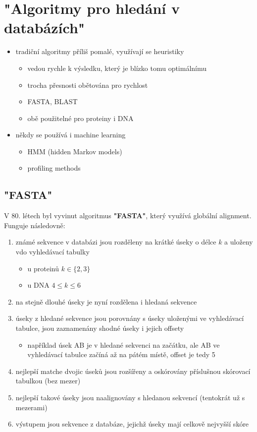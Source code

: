 \documentclass[DIV=8]{scrreprt}
\begin{document}
\section{"Algoritmy pro hledání v databázích"}

\begin{itemize}
    \item tradiční algoritmy příliš pomalé, využívají se heuristiky
\begin{itemize}
    \item vedou rychle k výsledku, který je blízko tomu optimálnímu
    \item trocha přesnosti obětována pro rychlost
    \item FASTA, BLAST
    \item obě použitelné pro proteiny i DNA
\end{itemize}

    \item někdy se používá i machine learning
\begin{itemize}
    \item HMM (hidden Markov models)
    \item profiling methods
\end{itemize}

\end{itemize}


\subsection{"FASTA"}

V 80. létech byl vyvinut algoritmus \textbf{"FASTA"}, který využívá globální alignment. Funguje následovně:
\begin{enumerate}
    \item známé sekvence v databázi jsou rozděleny na krátké úseky o délce \(k\) a uloženy vdo vyhledávací tabulky
\begin{itemize}
    \item u proteinů \(k \in \{2, 3\}\)
    \item u DNA \(4 \leq k \leq 6\)
\end{itemize}

    \item na stejně dlouhé úseky je nyní rozdělena i hledaná sekvence
    \item úseky z hledané sekvence jsou porovnány s úseky uloženými ve vyhledávací tabulce, jsou zaznamenány shodné úseky i jejich offsety
\begin{itemize}
    \item například úsek AB je v hledané sekvenci na začátku, ale AB ve vyhledávací tabulce začíná až na pátém místě, offset je tedy 5
\end{itemize}

    \item nejlepší matche dvojic úseků jsou rozšířeny a oskórovány příslušnou skórovací tabulkou (bez mezer)
    \item nejlepší takové úseky jsou naalignovány s hledanou sekvencí (tentokrát už s mezerami)
    \item výstupem jsou sekvence z databáze, jejichž úseky mají celkově nejvyšší skóre
\end{enumerate}
\end{document}
